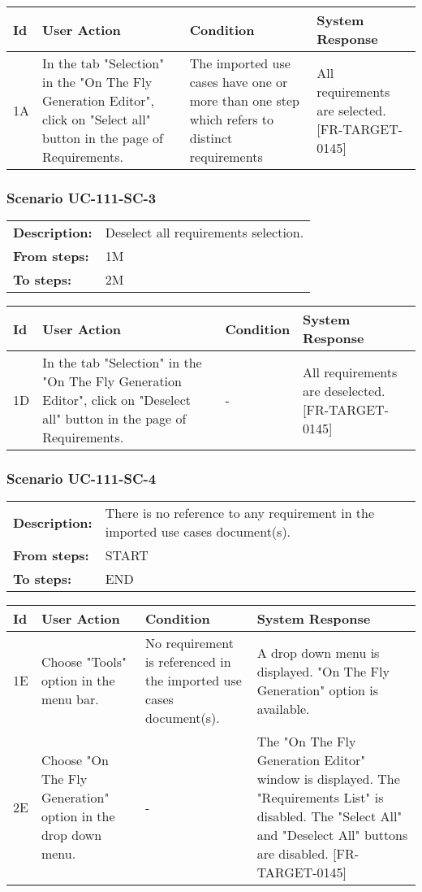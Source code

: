 \documentclass[a4paper,11pt]{article}
\newcommand{\bl}{\\ \hline}
\begin{document}
\begin{tabular}{|p{0.8in}|p{1.6in}|p{1.6in}|p{1.6in}|}
\hline
Id & User Action & Condition & System Response  \bl 
1A & In the tab "Selection" in the "On The Fly Generation Editor", click on "Select all" button in the page of Requirements. & The imported use cases have one or more than one step which refers to distinct requirements & All requirements are selected. [FR-TARGET-0145] \bl 
\end{tabular}
\subsubsection*{Scenario UC-111-SC-3}
\begin{tabular}{p{1in}p{4in}}
{\bf Description:} & Deselect all requirements selection. \\
{\bf From steps:} & 1M \\
{\bf To steps:} & 2M \\
\end{tabular}
 
\begin{tabular}{|p{0.8in}|p{1.6in}|p{1.6in}|p{1.6in}|}
\hline
Id & User Action & Condition & System Response  \bl 
1D & In the tab "Selection" in the "On The Fly Generation Editor", click on "Deselect all" button in the page of Requirements. & - & All requirements are deselected. [FR-TARGET-0145] \bl 
\end{tabular}
\subsubsection*{Scenario UC-111-SC-4}
\begin{tabular}{p{1in}p{4in}}
{\bf Description:} & There is no reference to any requirement in the imported use cases document(s). \\
{\bf From steps:} & START \\
{\bf To steps:} & END \\
\end{tabular}
 
\begin{tabular}{|p{0.8in}|p{1.6in}|p{1.6in}|p{1.6in}|}
\hline
Id & User Action & Condition & System Response  \bl 
1E & Choose "Tools" option in the menu bar. & No requirement is referenced in the imported use cases document(s). & A drop down menu is displayed. "On The Fly Generation" option is available. \bl 
2E & Choose "On The Fly Generation" option in the drop down menu. & - & The "On The Fly Generation Editor" window is displayed. The "Requirements List" is disabled. The "Select All" and "Deselect All" buttons are disabled. [FR-TARGET-0145] \bl 
\end{tabular}
\end{document}
